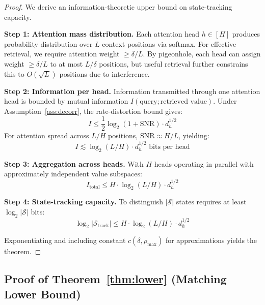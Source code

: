 \documentclass{article}
\theoremstyle{plain}
\theoremstyle{definition}
\theoremstyle{remark}
\begin{document}
\begin{proof}
We derive an information-theoretic upper bound on state-tracking capacity.

\textbf{Step 1: Attention mass distribution.} Each attention head $h \in [H]$ produces probability distribution over $L$ context positions via softmax. For effective retrieval, we require attention weight $\geq \delta/L$. By pigeonhole, each head can assign weight $\geq \delta/L$ to at most $L/\delta$ positions, but useful retrieval further constrains this to $O(\sqrt{L})$ positions due to interference.

\textbf{Step 2: Information per head.} Information transmitted through one attention head is bounded by mutual information $I(\text{query}; \text{retrieved value})$. Under Assumption~\ref{ass:decorr}, the rate-distortion bound gives:
\begin{equation}
I \leq \frac{1}{2} \log_2(1 + \text{SNR}) \cdot d_h^{1/2}
\end{equation}
For attention spread across $L/H$ positions, $\text{SNR} \approx H/L$, yielding:
\begin{equation}
I \lesssim \log_2(L/H) \cdot d_h^{1/2} \text{ bits per head}
\end{equation}

\textbf{Step 3: Aggregation across heads.} With $H$ heads operating in parallel with approximately independent value subspaces:
\begin{equation}
I_{\text{total}} \leq H \cdot \log_2(L/H) \cdot d_h^{1/2}
\end{equation}

\textbf{Step 4: State-tracking capacity.} To distinguish $|\mathcal{S}|$ states requires at least $\log_2 |\mathcal{S}|$ bits:
\begin{equation}
\log_2 |\mathcal{S}_{\text{track}}| \leq H \cdot \log_2(L/H) \cdot d_h^{1/2}
\end{equation}

Exponentiating and including constant $c(\delta, \rho_{\max})$ for approximations yields the theorem.
\end{proof}

\subsection{Proof of Theorem~\ref{thm:lower} (Matching Lower Bound)}
\end{document}
